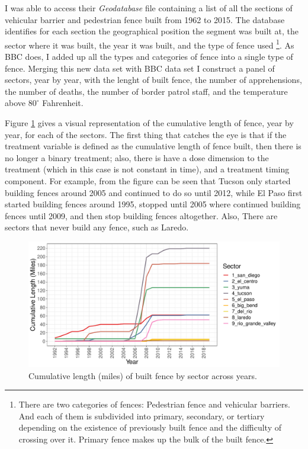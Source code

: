 \documentclass[titlepage]{article}
\theoremstyle{plain}
\theoremstyle{plain}
\begin{document}
I was able to access their \textit{Geodatabase} file containing a list of all the sections of vehicular barrier and pedestrian fence built from 1962 to 2015. The database identifies for each section the geographical position the segment was built at, the sector where it was built, the year it was built, and the type of fence used \footnote{There are two categories of fences: Pedestrian fence and vehicular barriers. And each of them is subdivided into primary, secondary, or tertiary depending on the existence of previously built fence and the difficulty of crossing over it. Primary fence makes up the bulk of the built fence.}. As BBC does, I added up all the types and categories of fence into a single type of fence. Merging this new data set with BBC data set I construct a panel of sectors, year by year, with the lenght of built fence, the number of apprehensions, the number of deaths, the number of border patrol staff, and the temperature above $80^{\circ}$ Fahrenheit.

Figure \ref{fig:plot_cum_length} gives a visual representation of the cumulative length of fence, year by year, for each of the sectors. The first thing that catches the eye is that if the treatment variable is defined as the cumulative length of fence built, then there is no longer a binary treatment; also, there is have a dose dimension to the treatment (which in this case is not constant in time), and a treatment timing component. For example, from the figure can be seen that Tucson only started building fences around 2005 and continued to do so until 2012, while El Paso first started building fences around 1995, stopped until 2005 where continued building fences until 2009, and then stop building fences altogether. Also, There are sectors that never build any fence, such as Laredo.

\begin{figure}[H]
	\centering
	\caption{Cumulative length (miles) of built fence by sector across years.} 
	\label{fig:plot_cum_length} 
	\includegraphics[width=\textwidth]{_images/plot_cum_length.pdf}
\end{figure}
\end{document}
